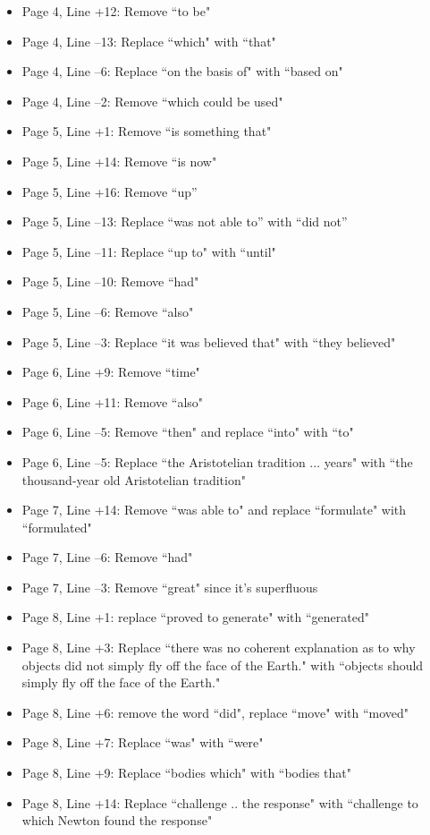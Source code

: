 \documentclass[11pt]{article}
\begin{document}
\begin{itemize}
\begin{itemize}
		\item Page 4, Line +12: Remove ``to be"
		\item Page 4, Line --13: Replace ``which" with ``that"
		\item Page 4, Line --6: Replace ``on the basis of" with ``based on"
		\item Page 4, Line --2: Remove ``which could be used"
		\item Page 5, Line +1: Remove ``is something that"
		\item Page 5, Line +14: Remove ``is now"
		\item Page 5, Line +16: Remove ``up”
		\item Page 5, Line --13: Replace ``was not able to” with ``did not”
		\item Page 5, Line --11: Replace ``up to" with ``until"
		\item Page 5, Line --10: Remove ``had"
		\item Page 5, Line --6: Remove ``also"
		\item Page 5, Line --3: Replace ``it was believed that" with ``they believed"
		\item Page 6, Line +9: Remove ``time"
		\item Page 6, Line +11: Remove ``also"
		\item Page 6, Line --5: Remove ``then" and replace ``into" with ``to"
		\item Page 6, Line --5: Replace ``the Aristotelian tradition ... years" with ``the thousand-year old Aristotelian tradition"
		\item Page 7, Line +14: Remove ``was able to" and replace ``formulate" with ``formulated"
		\item Page 7, Line --6: Remove ``had"
		\item Page 7, Line --3: Remove ``great" since it's superfluous
		\item Page 8, Line +1: replace ``proved to generate" with ``generated"
		\item Page 8, Line +3: Replace ``there was no coherent explanation as to why objects did not simply fly off the face of the Earth." with ``objects should simply fly off the face of the Earth."
		\item Page 8, Line +6: remove the word ``did", replace ``move" with ``moved"
		\item Page 8, Line +7: Replace ``was" with ``were"
		\item Page 8, Line +9: Replace ``bodies which" with ``bodies that"
		\item Page 8, Line +14: Replace ``challenge .. the response" with ``challenge to which Newton found the response"

\end{itemize}
\end{itemize}
\end{document}
